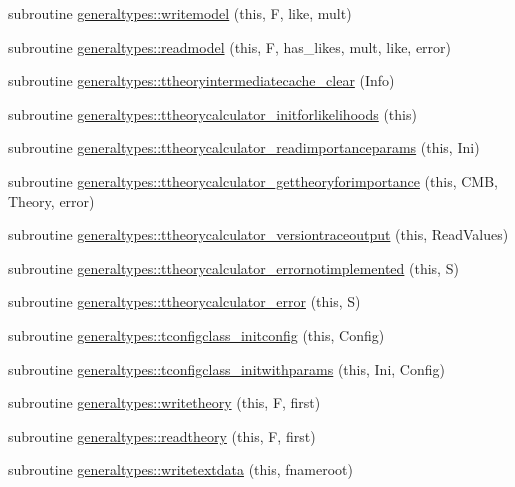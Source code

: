 \begin{DoxyCompactItemize}
subroutine \mbox{\hyperlink{namespacegeneraltypes_a6ae308a4d8fb255fd1e15dc6a8911931}{generaltypes\+::writemodel}} (this, F, like, mult)
\item 
subroutine \mbox{\hyperlink{namespacegeneraltypes_a9fdd457b58418041f9a4639dd76570db}{generaltypes\+::readmodel}} (this, F, has\+\_\+likes, mult, like, error)
\item 
subroutine \mbox{\hyperlink{namespacegeneraltypes_a890f7aa63579a54ec8ca5a3a8d19a607}{generaltypes\+::ttheoryintermediatecache\+\_\+clear}} (Info)
\item 
subroutine \mbox{\hyperlink{namespacegeneraltypes_aa79e01f130bcebe63ffce5dffb17950c}{generaltypes\+::ttheorycalculator\+\_\+initforlikelihoods}} (this)
\item 
subroutine \mbox{\hyperlink{namespacegeneraltypes_a207649e7d9a305b79b0016f9e5aae2d9}{generaltypes\+::ttheorycalculator\+\_\+readimportanceparams}} (this, Ini)
\item 
subroutine \mbox{\hyperlink{namespacegeneraltypes_a46caf82f82aed371c7f69a0168e9167b}{generaltypes\+::ttheorycalculator\+\_\+gettheoryforimportance}} (this, C\+MB, Theory, error)
\item 
subroutine \mbox{\hyperlink{namespacegeneraltypes_a79e614b9322bb431dd5c0cf1abde00ca}{generaltypes\+::ttheorycalculator\+\_\+versiontraceoutput}} (this, Read\+Values)
\item 
subroutine \mbox{\hyperlink{namespacegeneraltypes_af10543377b813170c5ba69fe2ebfdd44}{generaltypes\+::ttheorycalculator\+\_\+errornotimplemented}} (this, S)
\item 
subroutine \mbox{\hyperlink{namespacegeneraltypes_aa6c88f0919f7ac7fa030824300d48018}{generaltypes\+::ttheorycalculator\+\_\+error}} (this, S)
\item 
subroutine \mbox{\hyperlink{namespacegeneraltypes_a55eb95d894b131cff41c56b99c9f87cc}{generaltypes\+::tconfigclass\+\_\+initconfig}} (this, Config)
\item 
subroutine \mbox{\hyperlink{namespacegeneraltypes_ab4499296c04e7fca434f77eecbccea27}{generaltypes\+::tconfigclass\+\_\+initwithparams}} (this, Ini, Config)
\item 
subroutine \mbox{\hyperlink{namespacegeneraltypes_a739d15405356622a778b42627a1d39d4}{generaltypes\+::writetheory}} (this, F, first)
\item 
subroutine \mbox{\hyperlink{namespacegeneraltypes_aaa999beeb15e5412eba1146d1250b25f}{generaltypes\+::readtheory}} (this, F, first)
\item 
subroutine \mbox{\hyperlink{namespacegeneraltypes_a845e7a28effceab63f5aed42a4bf066a}{generaltypes\+::writetextdata}} (this, fnameroot)

\end{DoxyCompactItemize}
